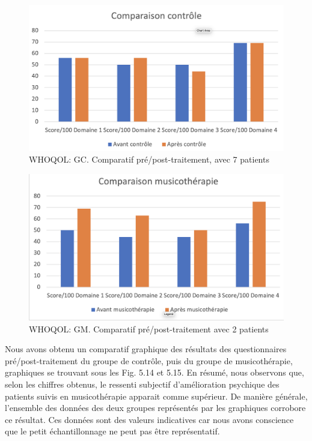  
 
 \begin{figure} [th]
 	\centering
 	\includegraphics[width=\linewidth]{images/Compcontrole.png}
 	\caption[Schéma du déroulement]{WHOQOL:  GC. Comparatif pré/post-traitement, avec 7 patients}
 	
 \end{figure}
 
 \begin{figure}[th]
 	\centering
 	\includegraphics[width=1.0\linewidth]{images/Compmusico.png}
 	\caption[Schéma du déroulement]{ WHOQOL: GM. Comparatif pré/post-traitement avec 2 patients}
 	
 \end{figure}
 
 
 Nous avons obtenu un comparatif graphique  des résultats des questionnaires
 pré/post-traitement du groupe de contrôle, puis du groupe de musicothérapie,
 graphiques se trouvant sous les Fig. 5.14 et 5.15.
 En résumé, nous observons que, selon les chiffres obtenus, le ressenti
 subjectif d'amélioration psychique
 des patients suivis en musicothérapie apparait comme
 supérieur.
 De manière générale, l'ensemble des données des deux groupes représentés
 par les graphiques corrobore ce résultat.
 Ces données sont des valeurs indicatives car nous avons conscience que le petit échantillonnage ne
 peut pas être représentatif.


